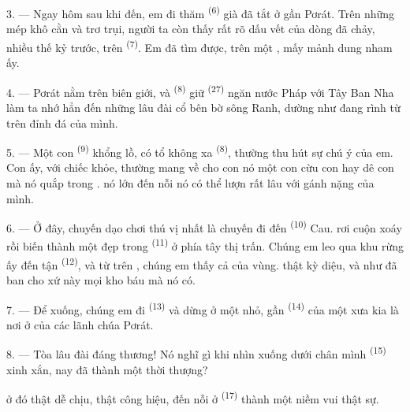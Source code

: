 \VUsaut{3.0mm}
\VUsaut{3.0mm}

3. --- Ngay hôm sau khi đến, em đi thăm  \textsuperscript{(6)} già
đã tắt ở gần Pơrát. Trên những mép  khô cằn và trơ trụi, người ta
còn thấy rất rõ dấu vết của dòng  đã chảy, nhiều thế kỷ trước, trên
 \textsuperscript{(7)}. Em đã tìm được, trên một ,
mấy mảnh dung nham ấy.

4. --- Pơrát nằm trên biên giới, và  \textsuperscript{(8)} giữ
 \textsuperscript{(27)} ngăn nước Pháp với Tây Ban Nha làm ta nhớ hẳn đến
những lâu đài cổ bên bờ sông Ranh, dường như đang rình  từ trên đỉnh đá của
mình.

5. --- Một con  \textsuperscript{(9)} khổng lồ, có tổ không xa
 \textsuperscript{(8)}, thường thu hút sự chú ý của em. Con  ấy, với chiếc  khỏe, thường mang về cho con nó một con cừu con hay dê
con mà nó quắp trong .  nó lớn đến nỗi nó có thể lượn rất lâu
với gánh nặng của mình.

\VUsaut{3.0mm}
\VUsaut{3.0mm}

6. --- Ở đây, chuyến dạo chơi thú vị nhất là chuyến đi đến 
\textsuperscript{(10)} Cau.  rơi cuộn xoáy rồi biến thành một
 đẹp trong  \textsuperscript{(11)} ở phía tây thị
trấn. Chúng em leo qua khu rừng ấy đến tận 
\textsuperscript{(12)}, và từ trên , chúng em thấy cả  của vùng.  thật kỳ diệu, và  như đã ban cho
xứ này mọi kho báu mà nó có.

7. --- Để xuống, chúng em đi  \textsuperscript{(13)} và dừng ở
một  nhỏ, gần  \textsuperscript{(14)} của một  xưa kia là nơi ở của các lãnh chúa Pơrát.

8. --- Tòa lâu đài đáng thương! Nó nghĩ gì khi nhìn xuống dưới chân mình  \textsuperscript{(15)} xinh xắn, nay đã thành một  thời thượng?

 ở đó thật dễ chịu,  thật công hiệu, đến nỗi
 ở  \textsuperscript{(17)} thành một niềm
vui thật sự.

